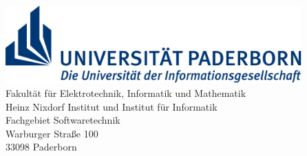 \thispagestyle{empty}
\begin{titlepage}
\begin{center}
	
	\begin{minipage}{13.5cm}		
		\includegraphics[height=3cm]{Images/TitlePage/uni-logo}\\
		\textsf{
    \hspace*{2.0cm} Fakult\"at f\"ur Elektrotechnik, Informatik und Mathematik \\
		\hspace*{2.0cm} Heinz Nixdorf Institut und Institut f\"ur Informatik\\
		\hspace*{2.0cm} Fachgebiet Softwaretechnik \\
		\hspace*{2.0cm} Warburger Stra\ss e 100 \\
		\hspace*{2.0cm} 33098 Paderborn
		}
	\end{minipage}\\[60pt]
  
  
  \begin{doublespace}
		{\Huge\textbf{\meinTitel}}\\[30pt]
	\end{doublespace} 
  

\end{center}
\end{titlepage}
